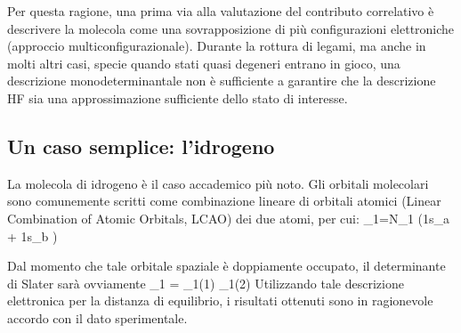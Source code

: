 Per questa ragione, una prima via alla valutazione del contributo
correlativo \`e descrivere la molecola come una sovrapposizione
di pi\`u configurazioni elettroniche (approccio multiconfigurazionale).
Durante la rottura di legami, ma anche in molti altri casi, specie quando
stati quasi degeneri entrano in gioco, una descrizione monodeterminantale
non \`e sufficiente a garantire che la descrizione HF sia una
approssimazione sufficiente dello stato di interesse.

\subsection{Un caso semplice: l'idrogeno}
\label{subsec:idrogeno}
La molecola di idrogeno \`e il caso accademico pi\`u noto. Gli orbitali
molecolari sono comunemente scritti come combinazione lineare di orbitali
atomici (Linear Combination of Atomic Orbitals, LCAO) dei due atomi, per cui:
\beq
\varphi_1=N_1 \left(1s_a + 1s_b \right)
\eeq

Dal momento che tale orbitale spaziale \`e doppiamente occupato,
il determinante di Slater sar\`a ovviamente
\beq
\Phi_1 = \varphi_1(1) \varphi_1(2) 
\eeq
Utilizzando tale descrizione elettronica per la distanza di equilibrio, i risultati
ottenuti sono in ragionevole accordo con il dato sperimentale.

